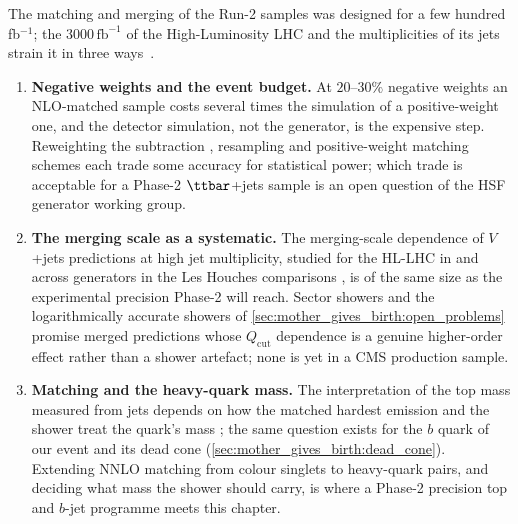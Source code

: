 The matching and merging of the Run-2 samples was designed for a few
hundred fb$^{-1}$; the $3000\,\mathrm{fb}^{-1}$ of the High-Luminosity
LHC and the multiplicities of its jets strain it in three
ways~\cite{Azzi:2019yne,HSFPhysicsEventGeneratorWG:2020gxw}.
\begin{enumerate}
  \item \textbf{Negative weights and the event budget.} At $20$--$30\%$
    negative weights an NLO-matched sample costs several times the
    simulation of a positive-weight one, and the detector simulation, not
    the generator, is the expensive step. Reweighting the subtraction
    \cite{Frederix:2020trv}, resampling \cite{Andersen:2020sjs} and
    positive-weight matching schemes \cite{Danziger:2021xvr} each trade
    some accuracy for statistical power; which trade is acceptable for a
    Phase-2 $\ttbar$+jets sample is an open question of the HSF generator
    working group.
  \item \textbf{The merging scale as a systematic.} The merging-scale
    dependence of $V$+jets predictions at high jet multiplicity, studied for
    the HL-LHC in \cite{Hoche:2019flt} and across generators in the Les
    Houches comparisons \cite{Amoroso:2020lgh}, is of the same size as the
    experimental precision Phase-2 will reach. Sector showers
    \cite{Brooks:2020mab} and the logarithmically accurate showers of
    \cref{sec:mother_gives_birth:open_problems} promise merged predictions
    whose $Q_{\mathrm{cut}}$ dependence is a genuine higher-order effect
    rather than a shower artefact; none is yet in a CMS production sample.
  \item \textbf{Matching and the heavy-quark mass.} The interpretation of
    the top mass measured from jets depends on how the matched hardest
    emission and the shower treat the quark's mass
    \cite{Nason:2017cxd,Hoang:2020iah}; the same question exists for the
    $b$ quark of our event and its dead cone
    (\cref{sec:mother_gives_birth:dead_cone}). Extending NNLO matching
    \cite{Monni:2019whf} from colour singlets to heavy-quark pairs, and
    deciding what mass the shower should carry, is where a Phase-2
    precision top and $b$-jet programme meets this chapter.
\end{enumerate}
